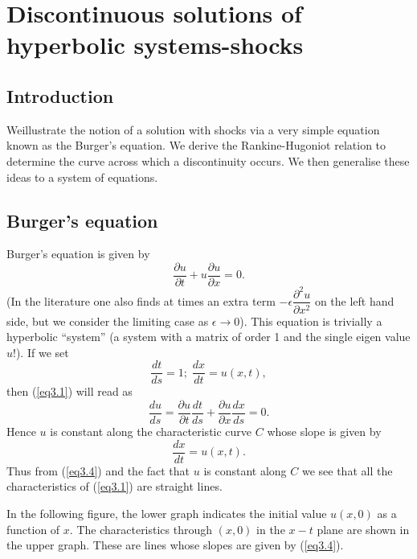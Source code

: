  
\chapter{Discontinuous solutions of hyperbolic systems-shocks}\label{chap3}

\section{Introduction}\label{chap3:sec3.1}

We\pageoriginale illustrate the notion of a solution with shocks via a
very simple equation known as the Burger's equation. We derive the
Rankine-Hugoniot relation to determine the curve across which a
discontinuity occurs. We then generalise these ideas to a system of
equations.

\section{Burger's equation}\label{chap3:sec3.2}

Burger's equation is given by
\begin{equation*}
\frac{\partial u}{\partial t} + u \frac{\partial u}{\partial x} = 0. 
\tag{3.1}\label{eq3.1}
\end{equation*}
(In the literature one also finds at times an extra term $-\epsilon
\dfrac{\partial^2 u}{\partial x^2}$ on the left hand side, but we
consider the limiting case as $\epsilon \to 0$). This equation is
trivially a hyperbolic ``system'' (a system with a matrix of order 1
and the single eigen value $u!$). If we set
\begin{equation*}
\frac{dt}{ds} = 1; \; \frac{dx}{dt} = u(x,t), \tag{3.2}\label{eq3.2}
\end{equation*}
then (\ref{eq3.1}) will read as 
\begin{equation*}
\frac{du}{ds} = \frac{\partial u}{\partial t} \frac{dt}{ds} +
\frac{\partial u}{\partial x} \frac{dx}{ds} = 0. \tag{3.3}\label{eq3.3}
\end{equation*}
Hence $u$ is constant along the characteristic curve $C$ whose slope
is given by 
\begin{equation*}
\frac{dx}{dt} = u (x,t). \tag{3.4}\label{eq3.4}
\end{equation*}
Thus from (\ref{eq3.4}) and the fact that $u$ is constant along $C$ we see
that all the characteristics of (\ref{eq3.1}) are straight lines.

In the following figure, the lower graph indicates the initial value
$u(x,0)$ as a function of $x$. The characteristics through $(x, 0)$
in the $x-t$ plane are shown in the upper graph. These are lines whose
slopes are given by (\ref{eq3.4}).
 

